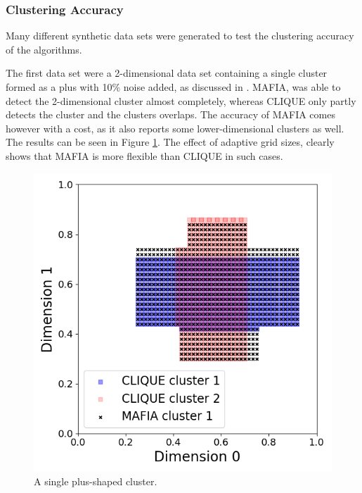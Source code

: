 \subsubsection{Clustering Accuracy}
Many different synthetic data sets were generated to test the clustering accuracy of the algorithms.

The first data set were a 2-dimensional data set containing a single cluster formed as a plus with 10\% noise added, as discussed in \cite{mafia}. MAFIA, was able to detect the 2-dimensional cluster almost completely, whereas CLIQUE only partly detects the cluster and the clusters overlaps. The accuracy of MAFIA comes however with a cost, as it also reports some lower-dimensional clusters as well. The results can be seen in Figure \ref{fig:accuracy_plus}. The effect of adaptive grid sizes, clearly shows that MAFIA is more flexible than CLIQUE in such cases.
\begin{figure}[H]
    \vspace*{-0.5cm}
    \centering
    \includegraphics[scale=0.27]{figures/accuracy_plus.png}
    \caption{A single plus-shaped cluster.}
    \label{fig:accuracy_plus}
    \vspace*{-0.5cm}
\end{figure}

